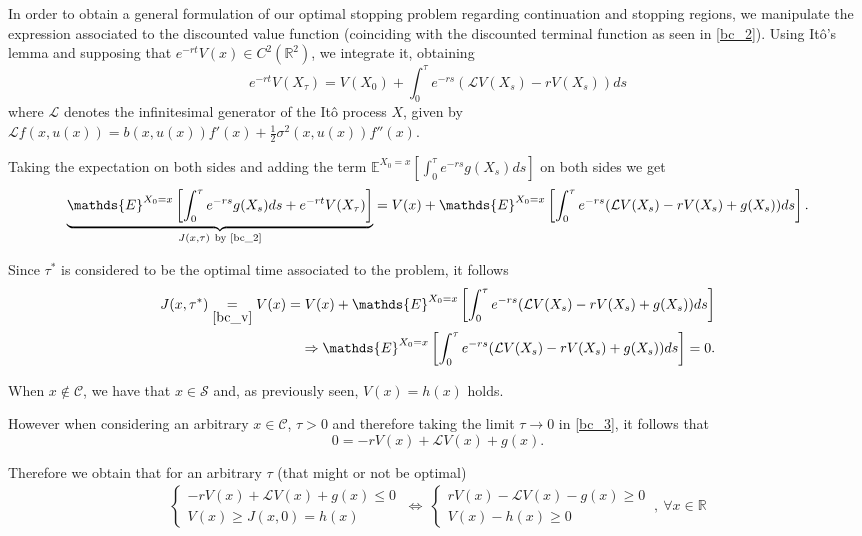 In order to obtain a general formulation of our optimal stopping problem regarding continuation and stopping regions, we manipulate the expression associated to the discounted value function (coinciding with the discounted terminal function as seen in \eqref{bc_2}). Using Itô's lemma and supposing that $e^{-r t} V(x) \in C^2(\mathds{R}^2)$, we integrate it, obtaining
\begin{equation*}
e^{-r t} V(X_\tau)=V(X_0)+\int^\tau_0 e^{-rs}(\mathcal{L} V(X_s) -r V(X_s)) ds
\end{equation*}
where $\mathcal{L}$ denotes the infinitesimal generator of the Itô process $X$, given by $\mathcal{L}f(x,u(x))=b(x,u(x)) f'(x)+\frac{1}{2}\sigma^2(x,u(x))f''(x)$.

Taking the expectation on both sides and adding the term $\mathds{E}^{X_0=x}\left[\int^\tau_0 e^{-rs} g(X_s) ds \right]$ on both sides we get
$$\underbrace{ \mathds{E}^{X_0=x} \left[  \int^\tau_0 e^{-rs} g(X_s) ds + e^{-r t} V(X_\tau) \right] }_{J(x,\tau) \ \text{by \eqref{bc_2}}} = V(x) +  \mathds{E}^{X_0=x} \left[ \int^\tau_0 e^{-rs}(\mathcal{L} V(X_s) -r V(X_s)+  g(X_s)) ds \right].$$

Since $\tau^*$ is considered to be the optimal time associated to the problem, it follows
\begin{align}
J(x,\tau^*) 
\underset{\eqref{bc_v}}{=} V(x)=  V(x) +  \mathds{E}^{X_0=x} \left[ \int^\tau_0 e^{-rs}(\mathcal{L} V(X_s) -r V(X_s)+  g(X_s)) ds \right] \nonumber \\
\Rightarrow \mathds{E}^{X_0=x} \left[ \int^\tau_0 e^{-rs}(\mathcal{L} V(X_s) -r V(X_s)+  g(X_s)) ds \right]=0.
\label{bc_3}
\end{align}

When $x \notin \mathcal{C}$, we have that $x \in \mathcal{S}$ and, as previously seen, $V(x)=h(x)$ holds.

However when considering an arbitrary $x \in \mathcal{C}$, $\tau>0$ and therefore taking the limit $\tau \rightarrow 0$ in \eqref{bc_3}, it follows that
$$0=-rV(x)+\mathcal{L}V(x)+g(x).$$

Therefore we obtain that for an arbitrary $\tau$ (that might or not be optimal)
\begin{align}
\begin{cases} 
-rV(x)+\mathcal{L}V(x)+g(x) \leq 0 \\
V(x) \geq J(x,0)=h(x)
\end{cases}
\ \Leftrightarrow \
\begin{cases} 
rV(x)-\mathcal{L}V(x)-g(x) \geq 0 \\
V(x)- h(x) \geq 0
\end{cases}
\ , \ \forall x \in \mathds{R}
\end{align}


